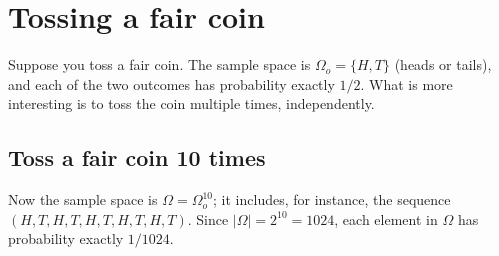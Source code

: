 \section{Tossing a fair coin}
\label{sec:FairCoin}

Suppose you toss a fair coin. The sample space is $\Omega_o = \{H,T\}$ (heads or tails), and each of the two outcomes has probability exactly $1/2$. What is more interesting is to toss the coin multiple times, independently. 

\subsection{Toss a fair coin 10 times}

Now the sample space is $\Omega = \Omega_o^{10}$; it includes, for instance, the sequence $(H,T,H,T,H,T,H,T,H,T)$. Since $|\Omega| = 2^{10} = 1024$, each element in $\Omega$ has probability exactly $1/1024$.

